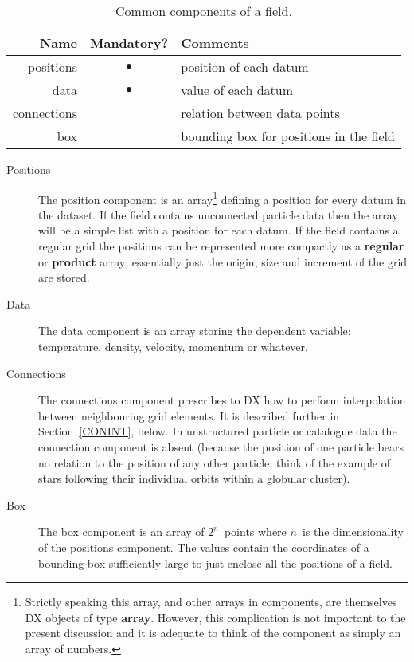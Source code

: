 \begin{table}[htbp]

\begin{center}
\begin{tabular}{rcl}
Name        & Mandatory? & Comments                                \\ \hline
positions   & $\bullet$  & position of each datum                  \\
data        & $\bullet$  & value of each datum                     \\
connections &            & relation between data points            \\
box         &            & bounding box for positions in the field \\
\end{tabular}
\end{center}

\begin{quote}
\item \caption[Common components of a field.]{Common components of a field.
\label{COMPONENTS} }
\end{quote}

\end{table}

\begin{description}

  \item[Positions] The position component is an array\footnote{Strictly
   speaking this array, and other arrays in components, are themselves
   DX objects of type {\bf array}. However, this complication is not
   important to the present discussion and it is adequate to think of
   the component as simply an array of numbers.} defining a
   position for every datum in the dataset. If the field contains
   unconnected particle data then the array will be a simple list
   with a position for each datum. If the field contains a regular
   grid the positions can be represented more compactly as a {\bf
   regular} or {\bf product} array; essentially just the origin, size
   and increment of the grid are stored.

  \item[Data] The data component is an array storing the dependent
   variable: temperature, density, velocity, momentum or whatever.

  \item[Connections] The connections component prescribes to DX how
   to perform interpolation between neighbouring grid elements. It
   is described further in Section~\ref{CONINT}, below. In unstructured
   particle or catalogue data the connection component is absent
   (because the position of one particle bears no relation to the
   position of any other particle; think of the example of stars following
   their individual orbits within a globular cluster).

  \item[Box] The box component is an array of $2^{n}$\, points where
   $n$\, is the dimensionality of the positions component. The values
   contain the coordinates of a bounding box sufficiently large to
   just enclose all the positions of a field.

\end{description}

